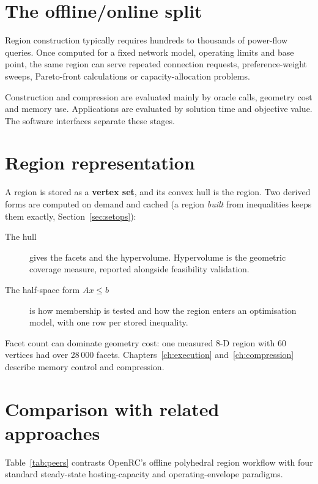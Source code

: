 \documentclass[11pt,a4paper]{report}
\newcommand{\why}[1]{\par\medskip\begingroup\noindent #1\par\endgroup\medskip}
\begin{document}
\section{The offline/online split}

Region construction typically requires hundreds to thousands of power-flow
queries. Once computed for a fixed network model, operating limits and base
point, the same region can serve repeated connection requests, preference-weight
sweeps, Pareto-front calculations or capacity-allocation problems.

\why{Construction and compression are evaluated mainly by oracle calls,
geometry cost and memory use. Applications are evaluated by solution time and
objective value. The software interfaces separate these stages.}

\section{Region representation}

A region is stored as a \textbf{vertex set}, and its convex hull is the region.
Two derived forms are computed on demand and cached (a region \emph{built} from
inequalities keeps them exactly, Section~\ref{sec:setops}):

\begin{description}
\item[The hull] gives the facets and the hypervolume. Hypervolume is the
  geometric coverage measure, reported alongside feasibility validation.
\item[The half-space form $Ax \le b$] is how membership is tested and how the
  region enters an optimisation model, with one row per stored inequality.
\end{description}

Facet count can dominate geometry cost: one measured 8-D region with
60 vertices had over 28\,000 facets. Chapters~\ref{ch:execution}
and~\ref{ch:compression} describe memory control and compression.

\section{Comparison with related approaches}

Table~\ref{tab:peers} contrasts OpenRC's offline polyhedral region workflow with
four standard steady-state hosting-capacity and operating-envelope paradigms.
\end{document}
